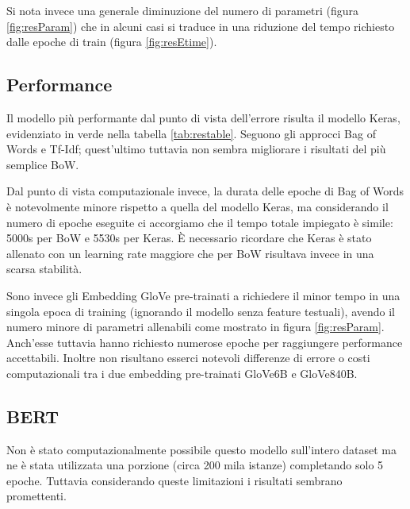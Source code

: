 Si nota invece una generale diminuzione del numero di parametri (figura
\ref{fig:resParam}) che in alcuni casi si traduce in una riduzione del tempo
richiesto dalle epoche di train (figura \ref{fig:resEtime}).

\subsection{Performance}
Il modello più performante dal punto di vista dell'errore risulta il modello
Keras, evidenziato in verde nella tabella \ref{tab:restable}. Seguono gli
approcci Bag of Words e Tf-Idf; quest'ultimo tuttavia non sembra migliorare i
risultati del più semplice BoW.

Dal punto di vista computazionale invece, la durata delle epoche di Bag of Words
è notevolmente minore rispetto a quella del modello Keras, ma considerando il
numero di epoche eseguite ci accorgiamo che il tempo totale impiegato è simile:
5000s per BoW e 5530s per Keras. È necessario ricordare che Keras è stato
allenato con un learning rate maggiore che per BoW risultava invece in una
scarsa stabilità.

Sono invece gli Embedding GloVe pre-trainati a richiedere il minor tempo in una
singola epoca di training (ignorando il modello senza feature testuali),
avendo il numero minore di parametri allenabili come mostrato in figura
\ref{fig:resParam}. Anch'esse tuttavia hanno richiesto numerose epoche per
raggiungere performance accettabili. Inoltre non risultano esserci notevoli differenze di errore o costi
computazionali tra i due embedding pre-trainati GloVe6B e GloVe840B.

\subsection{BERT}

Non è stato computazionalmente possibile questo modello sull'intero dataset ma
ne è stata utilizzata una porzione (circa 200 mila istanze) completando solo 5
epoche. Tuttavia considerando queste limitazioni i risultati sembrano
promettenti.